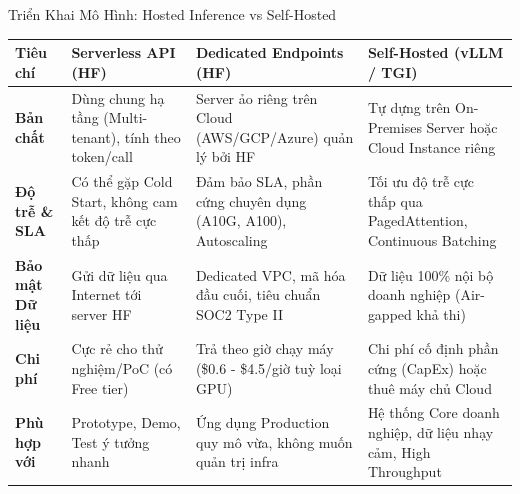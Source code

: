 \documentclass[aspectratio=169, 10pt]{beamer}
\begin{document}
\begin{frame}{Triển Khai Mô Hình: Hosted Inference vs Self-Hosted}
\begin{table}[]
\centering
\scriptsize
\renewcommand{\arraystretch}{1.2}
\begin{tabular}{@{}p{2.2cm}p{3.5cm}p{3.8cm}p{3.8cm}@{}}
\toprule
\textbf{Tiêu chí} & \textbf{Serverless API (HF)} & \textbf{Dedicated Endpoints (HF)} & \textbf{Self-Hosted (vLLM / TGI)} \\ \midrule
\textbf{Bản chất} & Dùng chung hạ tầng (Multi-tenant), tính theo token/call & Server ảo riêng trên Cloud (AWS/GCP/Azure) quản lý bởi HF & Tự dựng trên On-Premises Server hoặc Cloud Instance riêng \\
\textbf{Độ trễ \& SLA} & Có thể gặp Cold Start, không cam kết độ trễ cực thấp & Đảm bảo SLA, phần cứng chuyên dụng (A10G, A100), Autoscaling & Tối ưu độ trễ cực thấp qua PagedAttention, Continuous Batching \\
\textbf{Bảo mật Dữ liệu} & Gửi dữ liệu qua Internet tới server HF & Dedicated VPC, mã hóa đầu cuối, tiêu chuẩn SOC2 Type II & Dữ liệu 100\% nội bộ doanh nghiệp (Air-gapped khả thi) \\
\textbf{Chi phí} & Cực rẻ cho thử nghiệm/PoC (có Free tier) & Trả theo giờ chạy máy (\$0.6 - \$4.5/giờ tuỳ loại GPU) & Chi phí cố định phần cứng (CapEx) hoặc thuê máy chủ Cloud \\
\textbf{Phù hợp với} & Prototype, Demo, Test ý tưởng nhanh & Ứng dụng Production quy mô vừa, không muốn quản trị infra & Hệ thống Core doanh nghiệp, dữ liệu nhạy cảm, High Throughput \\ \bottomrule
\end{tabular}
\end{table}
\end{frame}
\end{document}

